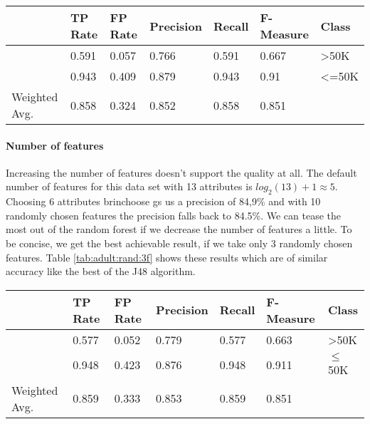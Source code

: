\documentclass[paper=a4, fontsize=11pt]{scrartcl} %
\numberwithin{equation}{section} %
\numberwithin{figure}{section} %
\numberwithin{table}{section} %
\begin{document}
\begin{table*}[htb]\centering
  \begin{tabular*}{\columnwidth}{@{}lllllll@{}}
      \toprule 
               &  TP Rate & FP Rate & Precision & Recall & F-Measure & Class \\ \midrule
               &  0.591   & 0.057   & 0.766     & 0.591  & 0.667     & >50K  \\
               &  0.943   & 0.409   & 0.879     & 0.943  & 0.91      & <=50K \\
Weighted Avg.  &  0.858   & 0.324   & 0.852     & 0.858  & 0.851     &       \\ \bottomrule
    \end{tabular*}
\caption{Random Forest -- 7 Random Trees each not more than 6 branches high} 
\label{tab:adult:rand:6d}
\end{table*}
\FloatBarrier

\paragraph{Number of features}
Increasing the number of features doesn't support the quality at all. The default number of features for this data set with 13 attributes is $ log_2(13) + 1 \approx 5 $. Choosing 6 attributes brinchoose gs us a precision of 84,9\% and with 10 randomly chosen features the precision falls back to 84.5\%. We can tease the most out of the random forest if we decrease the number of features a little. To be concise, we get the best achievable result, if we take only 3 randomly chosen
features. Table \ref{tab:adult:rand:3f} shows these results which are of similar accuracy like the best of the J48 algorithm. 

\begin{table*}[htb]\centering
  \begin{tabular*}{\columnwidth}{@{}lllllll@{}}
      \toprule 
               &  TP Rate & FP Rate & Precision & Recall & F-Measure & Class \\   \midrule
               &  0.577   & 0.052   & 0.779     & 0.577  & 0.663     & >50K  \\   
               &  0.948   & 0.423   & 0.876     & 0.948  & 0.911     & $\leq$50K \\   
Weighted Avg.  &  0.859   & 0.333   & 0.853     & 0.859  & 0.851     &       \\   \bottomrule
    \end{tabular*}
\caption{Random Forest -- 3 Random Features} 
\label{tab:adult:rand:3f}
\end{table*}
\FloatBarrier
\end{document}
